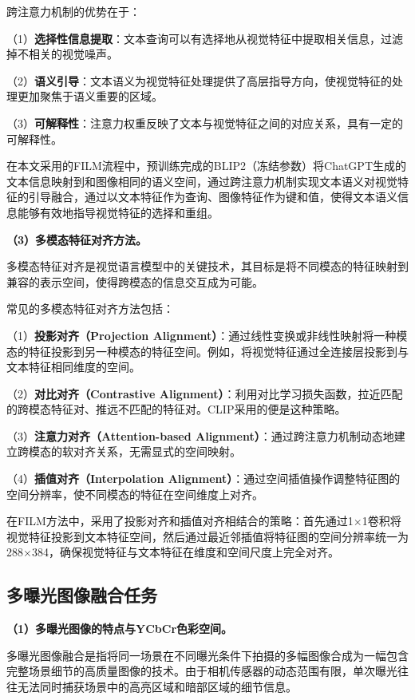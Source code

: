 跨注意力机制的优势在于：

（1）\textbf{选择性信息提取}：文本查询可以有选择地从视觉特征中提取相关信息，过滤掉不相关的视觉噪声。

（2）\textbf{语义引导}：文本语义为视觉特征处理提供了高层指导方向，使视觉特征的处理更加聚焦于语义重要的区域。

（3）\textbf{可解释性}：注意力权重反映了文本与视觉特征之间的对应关系，具有一定的可解释性。

在本文采用的FILM流程中，预训练完成的BLIP2（冻结参数）将ChatGPT生成的文本信息映射到和图像相同的语义空间，通过跨注意力机制实现文本语义对视觉特征的引导融合，通过以文本特征作为查询、图像特征作为键和值，使得文本语义信息能够有效地指导视觉特征的选择和重组。

\textbf{（3）多模态特征对齐方法。}

多模态特征对齐是视觉语言模型中的关键技术，其目标是将不同模态的特征映射到兼容的表示空间，使得跨模态的信息交互成为可能。

常见的多模态特征对齐方法包括：

（1）\textbf{投影对齐（Projection Alignment）}：通过线性变换或非线性映射将一种模态的特征投影到另一种模态的特征空间。例如，将视觉特征通过全连接层投影到与文本特征相同维度的空间。

（2）\textbf{对比对齐（Contrastive Alignment）}：利用对比学习损失函数，拉近匹配的跨模态特征对、推远不匹配的特征对。CLIP采用的便是这种策略。

（3）\textbf{注意力对齐（Attention-based Alignment）}：通过跨注意力机制动态地建立跨模态的软对齐关系，无需显式的空间映射。

（4）\textbf{插值对齐（Interpolation Alignment）}：通过空间插值操作调整特征图的空间分辨率，使不同模态的特征在空间维度上对齐。

在FILM方法中，采用了投影对齐和插值对齐相结合的策略：首先通过1$\times$1卷积将视觉特征投影到文本特征空间，然后通过最近邻插值将特征图的空间分辨率统一为288$\times$384，确保视觉特征与文本特征在维度和空间尺度上完全对齐。

\subsection{多曝光图像融合任务}\label{sec:mef_foundation}

\textbf{（1）多曝光图像的特点与YCbCr色彩空间。}

多曝光图像融合是指将同一场景在不同曝光条件下拍摄的多幅图像合成为一幅包含完整场景细节的高质量图像的技术。由于相机传感器的动态范围有限，单次曝光往往无法同时捕获场景中的高亮区域和暗部区域的细节信息。


